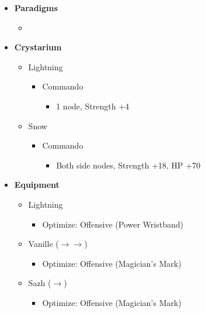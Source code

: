 	\begin{menu}
		\begin{itemize}
			\item \textbf{Paradigms}
			      \begin{itemize}
				      \item {}%
				            {\paradigmline{(\rav)}{\rav}{\rav}}%
				            {\paradigmline{\com}{\sen}{\med}}%
				            {\paradigmline[3]{\textit{[\com]}}{\textit{\com}}{\textit{\rav}}}%
				            {\paradigmline{[\com]}{\com}{\rav}}
			      \end{itemize}
			\item \textbf{Crystarium}
			      \begin{itemize}
				      \item Lightning
				            \begin{itemize}
					            \item Commando
					                  \begin{itemize}
						                  \item 1 node, Strength +4
					                  \end{itemize}
				            \end{itemize}
				      \item Snow
				            \begin{itemize}
					            \item Commando
					                  \begin{itemize}
						                  \item Both side nodes, Strength +18, HP +70
					                  \end{itemize}
				            \end{itemize}
			      \end{itemize}

			\item \textbf{Equipment}
			      \begin{itemize}
				      \item Lightning
				            \begin{itemize}
					            \item Optimize: Offensive (Power Wristband)
				            \end{itemize}
				      \item Vanille ($\rightarrow \rightarrow$)
				            \begin{itemize}
					            \item Optimize: Offensive (Magician's Mark)
				            \end{itemize}
				      \item Sazh ($\rightarrow$)
				            \begin{itemize}
					            \item Optimize: Offensive (Magician's Mark)
				            \end{itemize}
			      \end{itemize}
		\end{itemize}
	\end{menu}
	\renewcommand{\first}{[1] Tri-Disaster (\rav/\rav/\rav)}

